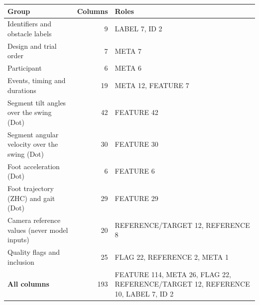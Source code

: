 \begin{tabular}{@{}p{6.2cm} r p{8.2cm}@{}}
\toprule
\textbf{Group} & \textbf{Columns} & \textbf{Roles} \\
\midrule
Identifiers and obstacle labels & 9 & LABEL 7, ID 2 \\
Design and trial order & 7 & META 7 \\
Participant & 6 & META 6 \\
Events, timing and durations & 19 & META 12, FEATURE 7 \\
Segment tilt angles over the swing (Dot) & 42 & FEATURE 42 \\
Segment angular velocity over the swing (Dot) & 30 & FEATURE 30 \\
Foot acceleration (Dot) & 6 & FEATURE 6 \\
Foot trajectory (ZHC) and gait (Dot) & 29 & FEATURE 29 \\
Camera reference values (never model inputs) & 20 & REFERENCE/TARGET 12, REFERENCE 8 \\
Quality flags and inclusion & 25 & FLAG 22, REFERENCE 2, META 1 \\
\midrule
\textbf{All columns} & 193 & FEATURE 114, META 26, FLAG 22, REFERENCE/TARGET 12, REFERENCE 10, LABEL 7, ID 2 \\
\bottomrule
\end{tabular}
